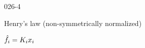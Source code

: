 \begin{mitframe}{026-4}
\begin{listone}
\begin{listtwo}
\begin{listthree}
\begin{listfour}
				\end{listfour}
                
 				\item Henry's law (non-symmetrically normalized)
                
                \begin{listfour}
                
                	\item    $\hat{\fug}_{\state}=\dilfac_{\state}\specfrac{i}$               

				\end{listfour}                                
	
			\end{listthree}

		\end{listtwo}    
        
\end{listone}        
        
\end{mitframe}
